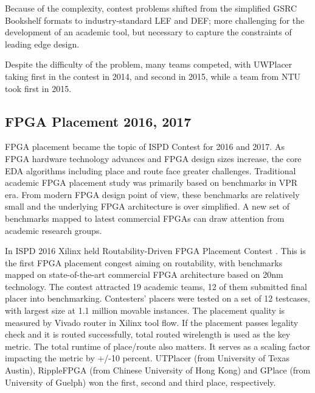 \documentclass[sigconf]{acmart}
\begin{document}
Because of the complexity, contest problems shifted from the
simplified GSRC Bookshelf formats to industry-standard LEF
and DEF; more challenging for the development of an academic
tool, but necessary to capture the constraints of leading edge
design.

Despite the difficulty of the problem, many teams competed,
with UWPlacer taking first in the contest in 2014\cite{Darav15}, and second in
2015\cite{Darav16}, while a team from NTU took first in 2015\cite{Huang15}.

\iffalse

\cite{Yutsis14}
Details, cite some papers.
Detail Routing.
{\bf Ismail?}
\fi


\subsection{FPGA Placement 2016, 2017}

FPGA placement became the topic of ISPD Contest for 2016 and 2017. As
FPGA hardware technology advances and FPGA design sizes increase, the
core EDA algorithms including place and route face greater
challenges. Traditional academic FPGA placement study was primarily
based on benchmarks in VPR\cite{Betz97} era. From modern FPGA design
point of view, these benchmarks are relatively small and the
underlying FPGA architecture is over simplified. A new set of
benchmarks mapped to latest commercial FPGAs can draw attention from
academic research groups.

In ISPD 2016 Xilinx held Routability-Driven FPGA Placement Contest
\cite{sy1}. This is the first FPGA placement congest aiming on routability,
with benchmarks mapped on state-of-the-art commercial FPGA
architecture based on 20nm technology. The contest attracted 19
academic teams, 12 of them submitted final placer into
benchmarking. Contesters' placers were tested on a set of 12
testcases, with largest size at 1.1 million movable instances. The
placement quality is measured by Vivado router in Xilinx tool flow. If
the placement passes legality check and it is routed successfully,
total routed wirelength is used as the key metric. The total runtime
of place/route also matters. It serves as a scaling factor impacting
the metric by +/-10 percent.  UTPlacer\cite{sy2}  (from University of Texas
Austin), RippleFPGA\cite{sy3}  (from Chinese University of Hong Kong) and
GPlace\cite{sy4}  (from University of Guelph) won the first, second and third
place, respectively.
\end{document}
